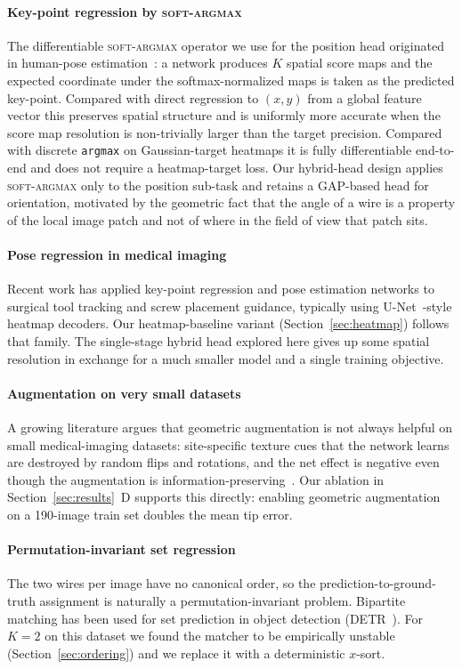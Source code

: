 \documentclass[conference,10pt,letterpaper]{IEEEtran}
\newcommand{\softargmax}{\textsc{soft-argmax}}
\begin{document}
\paragraph{Key-point regression by \softargmax}
The differentiable \softargmax{} operator we use for the position head
originated in human-pose estimation~\cite{newell2016,sun2018integral}: a
network produces $K$ spatial score maps and the expected coordinate under
the softmax-normalized maps is taken as the predicted key-point. Compared
with direct regression to $(x,y)$ from a global feature vector this
preserves spatial structure and is uniformly more accurate when the score
map resolution is non-trivially larger than the target precision.
Compared with discrete \texttt{argmax} on Gaussian-target heatmaps it is
fully differentiable end-to-end and does not require a heatmap-target
loss. Our hybrid-head design applies \softargmax{} only to the position
sub-task and retains a GAP-based head for orientation, motivated by the
geometric fact that the angle of a wire is a property of the local image
patch and not of where in the field of view that patch sits.

\paragraph{Pose regression in medical imaging}
Recent work has applied key-point regression and pose estimation networks
to surgical tool tracking and screw placement guidance, typically using
U-Net~\cite{ronneberger2015}-style heatmap decoders. Our heatmap-baseline
variant (Section~\ref{sec:heatmap}) follows that family. The
single-stage hybrid head explored here gives up some spatial resolution in
exchange for a much smaller model and a single training objective.

\paragraph{Augmentation on very small datasets}
A growing literature argues that geometric augmentation is not always
helpful on small medical-imaging datasets: site-specific texture cues
that the network learns are destroyed by random
flips and rotations, and the net effect is negative even though the
augmentation is information-preserving~\cite{shorten2019augsurvey}. Our
ablation in Section~\ref{sec:results}~D supports this directly:
enabling geometric augmentation on a 190-image train set doubles the
mean tip error.

\paragraph{Permutation-invariant set regression}
The two wires per image have no canonical order, so the
prediction-to-ground-truth assignment is naturally a permutation-invariant
problem. Bipartite matching has been used for set prediction in
object detection (DETR~\cite{carion2020detr}). For $K{=}2$ on this
dataset we found the matcher to be empirically unstable
(Section~\ref{sec:ordering}) and we replace it with a deterministic
$x$-sort.
\end{document}
